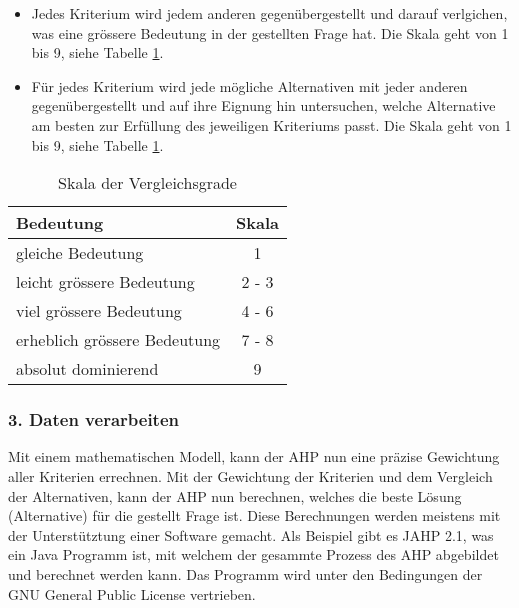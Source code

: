   \begin{itemize}
    \item Jedes Kriterium wird jedem anderen gegenübergestellt und darauf
    verlgichen, was eine grössere Bedeutung in der gestellten Frage hat. Die
    Skala geht von 1 bis 9, siehe Tabelle \ref{tab:vergleichsgrade}.
    \item Für jedes Kriterium wird jede mögliche Alternativen mit jeder anderen
    gegenübergestellt und auf ihre Eignung hin untersuchen, welche Alternative
    am besten zur Erfüllung des jeweiligen Kriteriums passt. Die Skala geht von
    1 bis 9, siehe Tabelle \ref{tab:vergleichsgrade}.
  \end{itemize}
  
  \begin{table}[ht]
    \begin{center}
      \begin{tabular}{lc}
        \toprule
        Bedeutung & Skala\\
        \midrule
        gleiche Bedeutung & 1\\
        leicht grössere Bedeutung & 2 - 3\\
        viel grössere Bedeutung & 4 - 6\\
        erheblich grössere Bedeutung & 7 - 8\\
        absolut dominierend & 9\\
        \bottomrule
      \end{tabular}
      \caption{Skala der Vergleichsgrade}
      \label{tab:vergleichsgrade}
    \end{center}
  \end{table}
    
  \subsubsection{3. Daten verarbeiten}
  
  Mit einem mathematischen Modell, kann der \ac{AHP} nun eine präzise Gewichtung
  aller Kriterien errechnen. Mit der Gewichtung der Kriterien und dem Vergleich
  der Alternativen, kann der \ac{AHP} nun berechnen, welches die beste Lösung
  (Alternative) für die gestellt Frage ist.
  Diese Berechnungen werden meistens mit der Unterstütztung einer Software
  gemacht. Als Beispiel gibt es JAHP 2.1, was ein Java Programm ist, mit 
  welchem der gesammte Prozess des \ac{AHP} abgebildet und berechnet werden
  kann. Das Programm wird unter den Bedingungen der GNU General Public License
  vertrieben.
    
